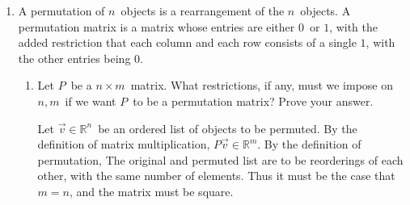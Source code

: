 \documentclass{letter}
\newcommand{\Vn}[1]{\vec{#1}}
\newcommand{\?}{\stackrel{?}{=}}
\newcommand\Que[1]{%
   \leavevmode\noindent
   #1
}
\newcommand\Ans[2][]{%
   \leavevmode\noindent
   {
       \begin{mdframed}[backgroundcolor=blue!10]
       #2
       \end{mdframed}
   }
}
\newenvironment{Mat}[1]{%
  \left[\begin{array}{*{#1}{r}}
}{%
  \end{array}\right]
}
\begin{document}
\begin{enumerate}
\begin{enumerate}
{\begin{align*}
\begin{Mat}{1}
                                                  m_2\cdot(\Vn{x}_1 + \Vn{x}_2) \\
                                                  \vdots \\
                                                  m_n\cdot(\Vn{x}_1 + \Vn{x}_2) \end{Mat} \\
                                &= M(\Vn{x}_1+\Vn{x}_2)
          \shortintertext{Thus the additive property is retained.  Now let $c\in\mathbb{R}$.}
          M(c\Vn{X}_1) &= \begin{Mat}{1} m_1\cdot(c\Vn{x}_1) \\ m_2\cdot(c\Vn{x}_1) \\ \vdots \\ m_n\cdot(c\Vn{x}_1) \end{Mat} 
                        = \begin{Mat}{1} c(m_1\cdot\Vn{x}_1) \\ c(m_2\cdot\Vn{x}_1) \\ \vdots \\ c(m_n\cdot(\Vn{x}_1) \end{Mat} \\
                       &= c\begin{Mat}{1} m_1\cdot\Vn{x}_1 \\ m_2\cdot\Vn{x}_1 \\ \vdots \\ m_n\cdot\Vn{x}_1 \end{Mat}
                        = cM\Vn{x}_1
      \end{align*}
      Thus the scalar multiplication property is retained, and M is a linear operator.
    }
    \end{enumerate}
    ~\\     
    \item 
        A permutation of $n$\ objects is a rearrangement of the $n$\ objects.  A permutation matrix is a matrix whose entries are either $0$\ or $1$, with the added restriction that each column and each row consists of a single $1$, with the other entries being $0$.
    \begin{enumerate}[label=(\alph*)]
    \item \Que{
        Let $P$\ be a $n\times m$\ matrix.  What restrictions, if any, must we impose on $n,m$\ if we want $P$\ to be a permutation matrix? 
        Prove your answer.        
    }
    \Ans{
       Let $\Vn{v} \in \mathbb{R}^n$\ be an ordered list of objects to be permuted.  By the definition of matrix multiplication, $P\Vn{v} \in \mathbb{R}^m$.  By the definition of permutation, The original and permuted list are to be reorderings of each other, with the same number of elements.  Thus it must be the case that $m=n$, and the matrix must be square.
}
\end{enumerate}
\end{enumerate}
\end{document}
